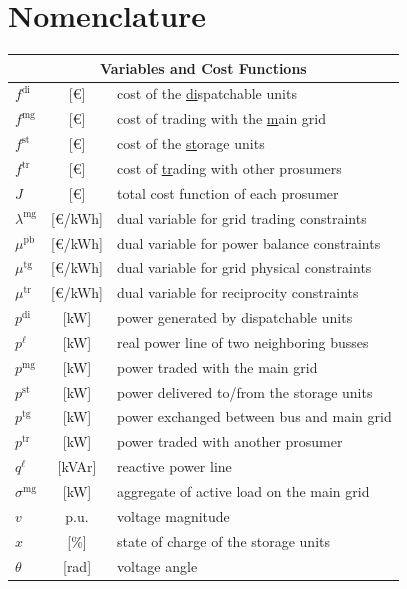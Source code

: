 \documentclass{IEEEtran}  %
\newcommand{\0}{\mathbf{0}}
\newcommand{\1}{\mathbf{1}}
\begin{document}
\section*{Nomenclature}
\begin{table}[h]
	\small 
	\begin{tabular}{l c l}
		\toprule
		\multicolumn{3}{c}{Variables and Cost Functions} \\
		\hline
		$f^{\mathrm{di}}$ & [\euro] & cost of the \underline{di}spatchable units  \\
		$f^{\mathrm{mg}}$ & [\euro] & cost of trading with the \underline{m}ain \underline{g}rid  \\
		$f^{\mathrm{st}}$ & [\euro] & cost  of the \underline{st}orage units  \\
		$f^{\mathrm{tr}}$ & [\euro]& cost  of \underline{tr}ading with other prosumers  \\
		$J$ &[\euro]  & total cost function of each prosumer \\
		$\lambda^{\mathrm{mg}}$ &[\euro/kWh] & dual variable for grid trading constraints %
		\\
		$\mu^{\mathrm{pb}}$ & [\euro/kWh]& dual variable for power balance constraints \\
		$\mu^{\mathrm{tg}}$ &[\euro/kWh] & dual variable for grid physical constraints
		\\
		$\mu^{\mathrm{tr}}$ &[\euro/kWh] & dual variable for reciprocity constraints \\
		$p^{\mathrm{di}}$ & [kW]& power generated by {di}spatchable units  \\
		$p^{\ell}$ &[kW] & real power line of two neighboring busses  \\
		$p^{\mathrm{mg}}$ &[kW] & power traded with the {m}ain {g}rid  \\
		$p^{\mathrm{st}}$ &[kW] & power delivered to/from the {st}orage units  \\
		$p^{\mathrm{tg}}$ &[kW] & power exchanged between bus and main grid \\	
		$p^{\mathrm{tr}}$ & [kW]& power {tr}aded with another prosumer  \\
		$q^{\ell}$ &[kVAr] & reactive power line   \\
		$\sigma^{\mathrm{mg}}$ &[kW] & aggregate of active load on the main grid \\
		$v$ &p.u. & voltage magnitude \\
		$x$ & [$\%$] & state of charge of the storage units\\
		$\theta$ & [rad]& voltage angle \\
		\hline 

	\end{tabular}
\end{table} 
\end{document}
